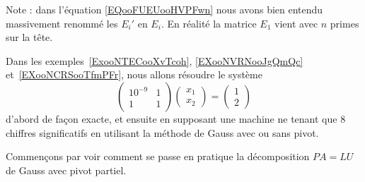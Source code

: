 Note : dans l'équation \eqref{EQooFUEUooHVPFwn} nous avons bien entendu massivement renommé les \( E_i'\) en \( E_i\). En réalité la matrice \( E_1\) vient avec \( n\) primes sur la tête.

Dans les exemples~\ref{ExooNTECooXvTcoh}, \ref{EXooNVRNooJgQmQc} et~\ref{EXooNCRSooTfmPFr}, nous allons résoudre le système
\begin{equation}
	\begin{pmatrix}
		10^{-9} & 1 \\
		1       & 1
	\end{pmatrix}\begin{pmatrix}
		x_1 \\
		x_2
	\end{pmatrix}=\begin{pmatrix}
		1 \\
		2
	\end{pmatrix}
\end{equation}
d'abord de façon exacte, et ensuite en supposant une machine ne tenant que \( 8\) chiffres significatifs en utilisant la méthode de Gauss avec ou sans pivot.

Commençons par voir comment se passe en pratique la décomposition \( PA=LU\) de Gauss avec pivot partiel.

